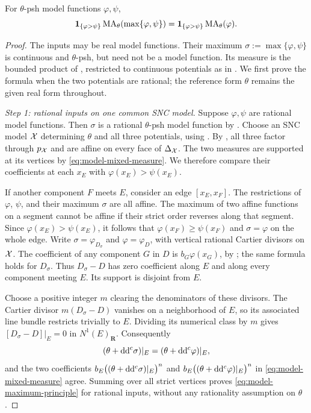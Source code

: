 \begin{proposition}\label{prop:model-maximum-principle}
For \(\theta\)-psh model functions \(\varphi,\psi\),
\begin{equation}
\label{eq:model-maximum-principle}
 \mathbf 1_{\{\varphi>\psi\}}
 \operatorname{MA}_\theta(\max\{\varphi,\psi\})
 =\mathbf 1_{\{\varphi>\psi\}}\operatorname{MA}_\theta(\varphi).
\end{equation}
\end{proposition}

\begin{proof}
The inputs may be real model functions.  Their maximum
\(\sigma:=\max\{\varphi,\psi\}\) is continuous and \(\theta\)-psh,
but need not be a model function.  Its measure is the bounded product of
, restricted to continuous potentials as
in .  We first prove the formula when
the two potentials are rational; the reference form \(\theta\) remains
the given real form throughout.

\emph{Step 1: rational inputs on one common SNC model.}
Suppose \(\varphi,\psi\) are rational model functions.  Then \(\sigma\)
is a rational \(\theta\)-psh model function by
.  Choose an SNC model \(\mathcal X\) determining
\(\theta\) and all three potentials, using .
By , all three factor through
\(p_{\mathcal X}\) and are affine on every face of \(\Delta_{\mathcal X}\).
The two measures are supported at its vertices by
\eqref{eq:model-mixed-measure}.  We therefore compare their coefficients
at each \(x_E\) with \(\varphi(x_E)>\psi(x_E)\).

If another component \(F\) meets \(E\), consider an edge
\([x_E,x_F]\).  The restrictions of \(\varphi\), \(\psi\), and their
maximum \(\sigma\) are all affine.  The maximum of two affine functions
on a segment cannot be affine if their strict order reverses along that
segment.  Since \(\varphi(x_E)>\psi(x_E)\), it follows that
\(\varphi(x_F)\geq\psi(x_F)\) and \(\sigma=\varphi\) on the whole
edge.  Write \(\sigma=\varphi_{D_\sigma}\) and
\(\varphi=\varphi_D\), with vertical rational Cartier divisors on
\(\mathcal X\).  The coefficient of any component \(G\) in \(D\) is
\(b_G\varphi(x_G)\), by
; the same formula holds for
\(D_\sigma\).  Thus \(D_\sigma-D\) has zero coefficient along \(E\)
and along every component meeting \(E\).  Its support is disjoint from
\(E\).

Choose a positive integer \(m\) clearing the denominators of these
divisors.  The Cartier divisor \(m(D_\sigma-D)\) vanishes on a
neighborhood of \(E\), so its associated line bundle restricts trivially
to \(E\).  Dividing its numerical class by \(m\) gives
\([D_\sigma-D]|_E=0\) in \(N^1(E)_{\mathbf R}\).  Consequently
\[
 (\theta+\mathrm d\mathrm d^c\sigma)|_E=(\theta+\mathrm d\mathrm d^c\varphi)|_E,
\]
and the two coefficients
\(b_E\bigl((\theta+\mathrm d\mathrm d^c\sigma)|_E\bigr)^n\) and
\(b_E\bigl((\theta+\mathrm d\mathrm d^c\varphi)|_E\bigr)^n\) in
\eqref{eq:model-mixed-measure} agree.  Summing over all strict vertices
proves \eqref{eq:model-maximum-principle} for rational inputs, without
any rationality assumption on \(\theta\).


\end{proof}
